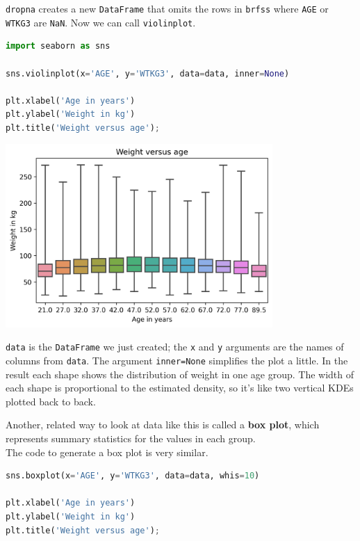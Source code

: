 \passthrough{\lstinline!dropna!} creates a new
\passthrough{\lstinline!DataFrame!} that omits the rows in
\passthrough{\lstinline!brfss!} where \passthrough{\lstinline!AGE!} or
\passthrough{\lstinline!WTKG3!} are \passthrough{\lstinline!NaN!}. Now
we can call \passthrough{\lstinline!violinplot!}.

\begin{lstlisting}[language=Python,style=source]
import seaborn as sns

sns.violinplot(x='AGE', y='WTKG3', data=data, inner=None)

plt.xlabel('Age in years')
plt.ylabel('Weight in kg')
plt.title('Weight versus age');
\end{lstlisting}

\begin{center}
\includegraphics[width=4in]{chapters/09_relationships_files/09_relationships_44_0.png}
\end{center}

\passthrough{\lstinline!data!} is the
\passthrough{\lstinline!DataFrame!} we just created; the
\passthrough{\lstinline!x!} and \passthrough{\lstinline!y!} arguments
are the names of columns from \passthrough{\lstinline!data!}. The
argument \passthrough{\lstinline!inner=None!} simplifies the plot a
little. In the result each shape shows the distribution of weight in one
age group. The width of each shape is proportional to the estimated
density, so it's like two vertical KDEs plotted back to back.

Another, related way to look at data like this is called a \textbf{box
plot}, which represents summary statistics for the values in each
group.\\
The code to generate a box plot is very similar.

\begin{lstlisting}[language=Python,style=source]
sns.boxplot(x='AGE', y='WTKG3', data=data, whis=10)

plt.xlabel('Age in years')
plt.ylabel('Weight in kg')
plt.title('Weight versus age');
\end{lstlisting}

